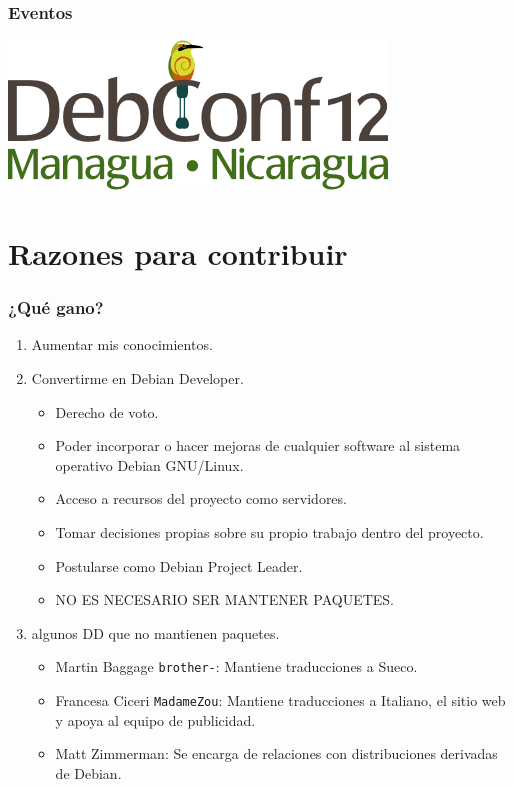 \documentclass{beamer}
\begin{document}
\begin{frame}
\frametitle{Eventos}
        \begin{center}
                 \includegraphics[scale=0.50]{../img/debconf_12_nicaragua.png}
        \end{center}
\end{frame}


\section{Razones para contribuir}

\begin{frame}
\frametitle{¿Qu\'e gano?}
             \begin{enumerate}
		\pause \item Aumentar mis conocimientos.
		\pause \item Convertirme en Debian Developer.
		\begin {itemize}
			\pause \item Derecho de voto.
			\pause \item Poder incorporar o hacer mejoras de cualquier software al sistema operativo Debian GNU/Linux.
			\pause \item Acceso a recursos del proyecto como servidores.
			\pause \item Tomar decisiones propias sobre su propio trabajo dentro del proyecto.
			\pause \item Postularse como Debian Project Leader.
			\pause \item \alert{NO ES NECESARIO SER MANTENER PAQUETES.}
		\end{itemize}
		\pause \item algunos DD que no mantienen paquetes.
		\begin{itemize}
			\pause \item Martin Baggage \texttt{brother-}: Mantiene traducciones a Sueco.
			\pause \item Francesa Ciceri \texttt{MadameZou}: Mantiene traducciones a Italiano, el sitio web y apoya al equipo de publicidad.
			\pause \item Matt Zimmerman: Se encarga de relaciones con distribuciones derivadas de Debian.
		\end{itemize}
	     \end{enumerate}
\end{frame}
\end{document}
